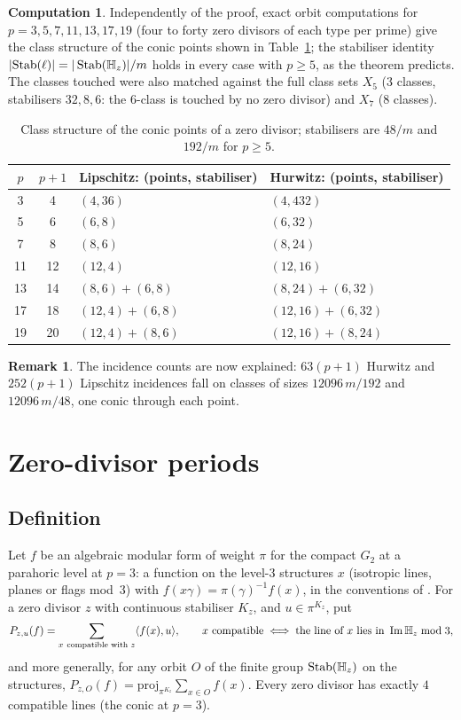 \documentclass[11pt]{amsart}
\theoremstyle{definition}
\newtheorem{remark}[theorem]{Remark}
\newtheorem{computation}[theorem]{Computation}
\newcommand{\Stab}{\operatorname{Stab}}\newcommand{\Aut}{\operatorname{Aut}}\newcommand{\Der}{\operatorname{Der}}\renewcommand{\Im}{\operatorname{Im}}
\begin{document}
\begin{computation}
Independently of the proof, exact orbit computations for $p=3,5,7,11,13,17,19$ (four to forty zero divisors of each type per prime) give the class structure of the conic points shown in Table~\ref{tab:conic}; the stabiliser identity $|{\rm Stab}(\ell)|=|\Stab(\Hq_z)|/m$ holds in every case with $p\ge 5$, as the theorem predicts. The classes touched were also matched against the full class sets $X_5$ ($3$ classes, stabilisers $32,8,6$: the $6$-class is touched by no zero divisor) and $X_7$ ($8$ classes).
\end{computation}
\begin{table}[h]\centering
\begin{tabular}{c c l l}\toprule
$p$ & $p+1$ & Lipschitz: (points, stabiliser) & Hurwitz: (points, stabiliser)\\\midrule
3 & 4 & $(4,36)$ & $(4,432)$\\
5 & 6 & $(6,8)$ & $(6,32)$\\
7 & 8 & $(8,6)$ & $(8,24)$\\
11 & 12 & $(12,4)$ & $(12,16)$\\
13 & 14 & $(8,6)+(6,8)$ & $(8,24)+(6,32)$\\
17 & 18 & $(12,4)+(6,8)$ & $(12,16)+(6,32)$\\
19 & 20 & $(12,4)+(8,6)$ & $(12,16)+(8,24)$\\\bottomrule
\end{tabular}
\caption{Class structure of the conic points of a zero divisor; stabilisers are $48/m$ and $192/m$ for $p\ge 5$.}\label{tab:conic}
\end{table}
\begin{remark}
The incidence counts are now explained: $63(p+1)$ Hurwitz and $252(p+1)$ Lipschitz incidences fall on classes of sizes $12096\,m/192$ and $12096\,m/48$, one conic through each point.
\end{remark}

\section{Zero-divisor periods}\label{sec:periods}
\subsection{Definition}
Let $f$ be an algebraic modular form of weight $\pi$ for the compact $G_2$ at a parahoric level at $p=3$: a function on the level-$3$ structures $x$ (isotropic lines, planes or flags mod~$3$) with $f(x\gamma)=\pi(\gamma)^{-1}f(x)$, in the conventions of \cite{PartII}. For a zero divisor $z$ with continuous stabiliser $K_z$, and $u\in\pi^{K_z}$, put
\[P_{z,u}(f)=\sum_{x\ \text{compatible with }z}\langle f(x),u\rangle,\qquad x\text{ compatible}\iff\text{the line of }x\text{ lies in }\Im\Hq_z\bmod 3,\]
and more generally, for any orbit $O$ of the finite group $\Stab(\Hq_z)$ on the structures, $P_{z,O}(f)=\mathrm{proj}_{\pi^{K_z}}\sum_{x\in O}f(x)$. Every zero divisor has exactly $4$ compatible lines (the conic at $p=3$).
\end{document}
